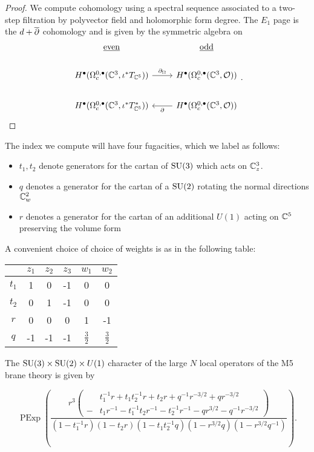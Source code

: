 \begin{proof}
  We compute cohomology using a spectral sequence associated to a two-step filtration by polyvector field and holomorphic form degree. The $E_{1}$ page is the $d+\overline{\partial}$ cohomology and is given by the symmetric algebra on

  \[
\begin{tikzcd}
\ul{\rm even} & \ul{\rm odd} \\
H^{\bullet}(\Omega^{0,\bullet}_{c} (\C^{3}, \iota^{*}T_{\C^{5}})) \ar[r, "\del_{\Omega}"] & H^{\bullet}(\Omega^{0,\bullet}_{c} (\C^{3}, \cO) )\\
H^{\bullet}(\Omega^{0,\bullet}_{c} (\C^{3},  \iota^{*}T^{*}_{\C^{5}}))& H^{\bullet}(\Omega^{0,\bullet}_{c} (\C^{3}, \cO)) \ar[l, "\del"]
\end{tikzcd}
.\]


\end{proof}

The index we compute will have four fugacities, which we label as follows:
\begin{itemize}
  \item $t_{1}, t_{2}$ denote generators for the cartan of $\operatorname{SU}(3)$ which acts on $\mathbb{C}^{3}_{z}$.
  \item $q$ denotes a generator for the cartan of a $\operatorname{SU}(2)$ rotating the normal directions $\mathbb{C}^{2}_{w}$
  \item $r$ denotes a generator for the cartan of an additional $U(1)$ acting on $\mathbb{C}^{5}$ preserving the volume form
\end{itemize}

A convenient choice of choice of weights is as in the following table:

\begin{center}
\begin{tabular}{c c c c c c}
  & $z_{1}$ & $z_{2}$ & $z_{3}$ & $w_{1}$ & $w_{2}$ \\
  \hline
  $t_{1}$ & 1 & 0 & -1 & 0 & 0 \\
  $t_{2}$ & 0 & 1 & -1 & 0 & 0 \\
  $r$ & 0 & 0 & 0 & 1 & -1 \\
  $q$ & -1 & -1 & -1 & $\frac{3}{2}$ & $\frac{3}{2}$
\end{tabular}
\end{center}

\begin{prop}
  The $\operatorname{SU}(3)\times \operatorname{SU}(2)\times U(1)$ character of the large $N$ local operators of the M5 brane theory is given by

  \[ \operatorname{PExp} \left (\frac{r^{3}\left (\begin{aligned} & t_{1}^{-1}r+t_{1}t_{2}^{-1}r+t_{2}r+q^{-1}r^{-3/2}+qr^{-3/2} \\  - & t_{1}r^{-1}-t_{1}^{-1}t_{2}r^{-1}-t_{2}^{-1}r^{-1}-qr^{3/2}-q^{-1}r^{-3/2}
          \end{aligned}\right)}{(1-t_{1}^{-1}r)(1-t_{2}r)(1-t_{1}t_{2}^{-1}q)(1-r^{3/2}q)(1-r^{3/2}q^{-1})}\right ).\]
  \end{prop}
